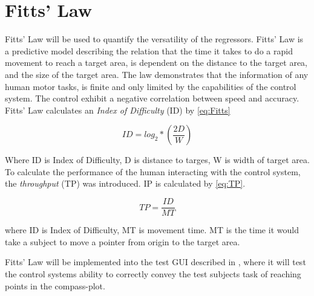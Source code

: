 \section{Fitts' Law}

Fitts' Law will be used to quantify the versatility of the regressors. Fitts' Law is a predictive model describing the relation that the time it takes to do a rapid movement to reach a target area, is dependent on the distance to the target area, and the size of the target area. The law demonstrates that the information of any human motor tasks, is finite and only limited by the capabilities of the control system. The control exhibit a negative correlation between speed and accuracy. \cite{Kamavuako2014}
Fitts' Law calculates an \textit{Index of Difficulty} (ID) by \eqref{eq:Fitts}

\begin{equation} \label{eq:Fitts}
ID = log_{2} * (\frac{2D}{W})
\end{equation}

Where ID is Index of Difficulty, D is distance to targes, W is width of target area.
To calculate the performance of the human interacting with the control system, the \textit{throughput} (TP) was introduced. IP is calculated by \eqref{eq:TP}.

\begin{equation} \label{eq:TP}
TP = \frac{ID}{MT}
\end{equation}

where ID is Index of Difficulty, MT is movement time.
MT is the time it would take a subject to move a pointer from origin to the target area.

Fitts' Law will be implemented into the test GUI described in , where it will test the control systems ability to correctly convey the test subjects task of reaching points in the compass-plot. 

